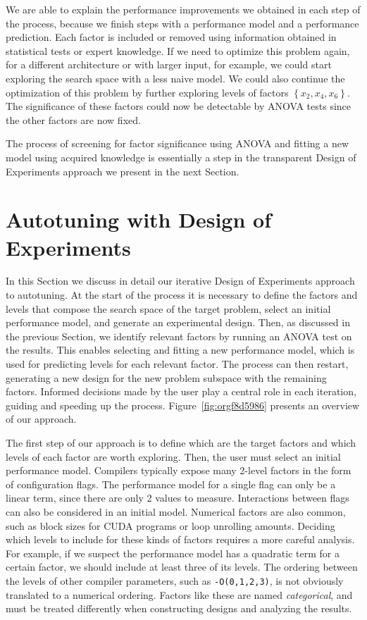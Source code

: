 \documentclass[conference]{IEEEtran}
\begin{document}
We are able to explain the performance improvements we obtained in each step of
the process, because we finish steps with a performance model and a performance
prediction. Each factor is included or removed using information obtained in
statistical tests or expert knowledge. If we need to optimize this problem
again, for a different architecture or with larger input, for example, we could
start exploring the search space with a less naive model. We could also continue
the optimization of this problem by further exploring levels of factors
\(\left\{x_2,x_4,x_6\right\}\). The significance of these factors could now be
detectable by ANOVA tests since the other factors are now fixed.

The process of screening for factor significance using ANOVA and fitting a
new model using acquired knowledge is essentially a step in the transparent
Design of Experiments approach we present in the next Section.
\section{Autotuning with Design of Experiments}
\label{sec:org791ad69}
In this Section we discuss in detail our iterative Design of Experiments
approach to autotuning. At the start of the process it is necessary to define
the factors and levels that compose the search space of the target problem,
select an initial performance model, and generate an experimental design. Then,
as discussed in the previous Section, we identify relevant factors by running an
ANOVA test on the results. This enables selecting and fitting a new performance
model, which is used for predicting levels for each relevant factor. The process
can then restart, generating a new design for the new problem subspace with the
remaining factors. Informed decisions made by the user play a central role in
each iteration, guiding and speeding up the process.
Figure~\ref{fig:orgf8d5986} presents an overview of our approach.

The first step of our approach is to define which are the target factors and
which levels of each factor are worth exploring. Then, the user must select an
initial performance model. Compilers typically expose many 2-level factors in
the form of configuration flags. The performance model for a single flag can
only be a linear term, since there are only 2 values to measure. Interactions
between flags can also be considered in an initial model. Numerical factors are
also common, such as block sizes for CUDA programs or loop unrolling amounts.
Deciding which levels to include for these kinds of factors requires a more
careful analysis. For example, if we suspect the performance model has a
quadratic term for a certain factor, we should include at least three of its
levels. The ordering between the levels of other compiler parameters, such as
\texttt{-O(0,1,2,3)}, is not obviously translated to a numerical ordering.
Factors like these are named \emph{categorical}, and must be treated differently when
constructing designs and analyzing the results.
\end{document}
